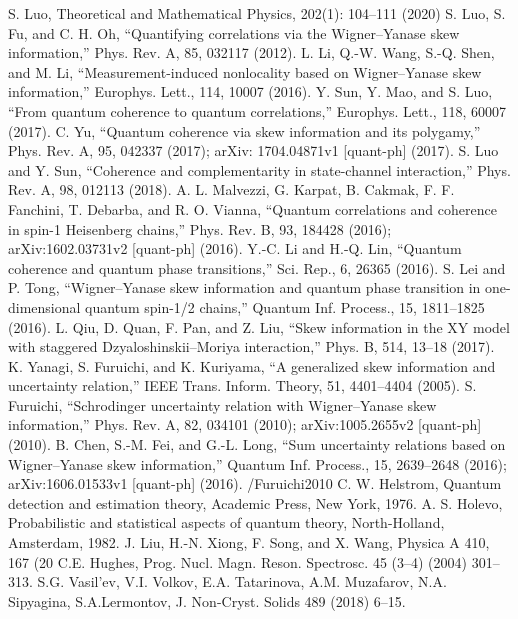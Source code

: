 \begin{thebibliography}{}
  S. Luo, Theoretical and Mathematical Physics, 202(1): 104–111 (2020)
  S. Luo, S. Fu, and C. H. Oh, “Quantifying correlations via the Wigner–Yanase skew information,” Phys. Rev. A, 85, 032117 (2012).
  L. Li, Q.-W. Wang, S.-Q. Shen, and M. Li, “Measurement-induced nonlocality based on Wigner–Yanase skew information,” Europhys. Lett., 114, 10007 (2016).
  Y. Sun, Y. Mao, and S. Luo, “From quantum coherence to quantum correlations,” Europhys. Lett., 118, 60007 (2017).
  C. Yu, “Quantum coherence via skew information and its polygamy,” Phys. Rev. A, 95, 042337 (2017); arXiv: 1704.04871v1 [quant-ph] (2017).
  S. Luo and Y. Sun, “Coherence and complementarity in state-channel interaction,” Phys. Rev. A, 98, 012113 (2018).
  A. L. Malvezzi, G. Karpat, B. Cakmak, F. F. Fanchini, T. Debarba, and R. O. Vianna, “Quantum correlations and coherence in spin-1 Heisenberg chains,” Phys. Rev. B, 93, 184428 (2016); arXiv:1602.03731v2 [quant-ph] (2016).
  Y.-C. Li and H.-Q. Lin, “Quantum coherence and quantum phase transitions,” Sci. Rep., 6, 26365 (2016).
  S. Lei and P. Tong, “Wigner–Yanase skew information and quantum phase transition in one-dimensional quantum spin-1/2 chains,” Quantum Inf. Process., 15, 1811–1825 (2016).
  L. Qiu, D. Quan, F. Pan, and Z. Liu, “Skew information in the XY model with staggered Dzyaloshinskii–Moriya interaction,” Phys. B, 514, 13–18 (2017).
  K. Yanagi, S. Furuichi, and K. Kuriyama, “A generalized skew information and uncertainty relation,” IEEE Trans. Inform. Theory, 51, 4401–4404 (2005).
  S. Furuichi, “Schrodinger uncertainty relation with Wigner–Yanase skew information,” Phys. Rev. A, 82, 034101 (2010); arXiv:1005.2655v2 [quant-ph] (2010).
  B. Chen, S.-M. Fei, and G.-L. Long, “Sum uncertainty relations based on Wigner–Yanase skew information,” Quantum Inf. Process., 15, 2639–2648 (2016); arXiv:1606.01533v1 [quant-ph] (2016). /Furuichi2010
  C. W. Helstrom, Quantum detection and estimation theory, Academic Press, New York, 1976.
  A. S. Holevo, Probabilistic and statistical aspects of quantum theory, North-Holland, Amsterdam, 1982.
  J. Liu, H.-N. Xiong, F. Song, and X. Wang, Physica A 410, 167 (20
  C.E. Hughes, Prog. Nucl. Magn. Reson. Spectrosc. 45 (3–4) (2004) 301–313.
  S.G. Vasil’ev, V.I. Volkov, E.A. Tatarinova, A.M. Muzafarov, N.A. Sipyagina, S.A.Lermontov, J. Non-Cryst. Solids 489 (2018) 6–15.

\end{thebibliography}
